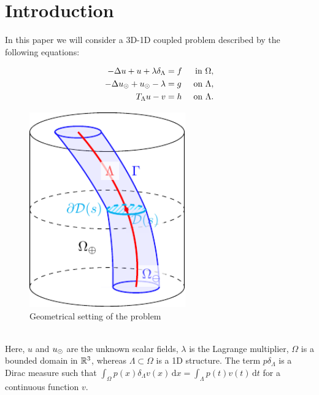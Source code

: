 \documentclass[r]{siamart171218}
\begin{document}
\section{Introduction}\label{sec:intro}

In this paper we will consider a 3D-1D coupled problem described by the following equations:\\
\begin{minipage}{0.5\textwidth}
\begin{subequations}
\label{eq:pde}
\begin{align}
\label{eq:pde1}
  -\Delta u + u + \lambda \delta_{\Lambda} &= f &\mbox{ in } \Omega,\\
\label{eq:pde2}
-\Delta \ud + \ud - \lambda &= g &\mbox{ on } \Lambda,\\
\label{eq:coupling}
T_\Lambda u - v  &=  h &\mbox{ on } \Lambda . 
\end{align}
\end{subequations}
\end{minipage}
%
\begin{minipage}{0.45\textwidth}
\begin{figure}[H]
\begin{center}
\includegraphics[width=0.6\textwidth]{domain.pdf}
\end{center}
\caption{Geometrical setting of the problem}
\label{fig1}
\end{figure}
\end{minipage}\\
Here, $u$ and $u_{\odot}$ are the unknown scalar fields,  $\lambda$ is the Lagrange multiplier,  $\Omega$ is a bounded domain in $\mathbb{R}^3$, whereas $\Lambda \subset \Omega$ is a 1D structure. 
The term $p\delta_{\Lambda}$ is a Dirac measure such that 
$\int_{\Omega}p(x)\delta_{\Lambda}v(x)\,\mathrm{d}x=\int_{\Lambda}p(t)v(t) \,\mathrm{d}t$
for a continuous function $v$. 
\end{document}
